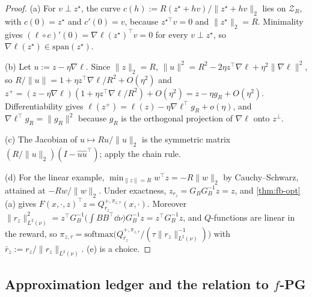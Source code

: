 \begin{proof}
(a) For $v\perp z^\star$, the curve $c(h):=R(z^\star+hv)/\|z^\star+hv\|_2$ lies on $\mathcal Z_R$, with $c(0)=z^\star$ and $c'(0)=v$, because $z^{\star\top}v=0$ and $\|z^\star\|_2=R$.
Minimality gives $(\ell\circ c)'(0)=\nabla\ell(z^\star)^\top v=0$ for every $v\perp z^\star$, so $\nabla\ell(z^\star)\in\mathrm{span}(z^\star)$.

(b) Let $u:=z-\eta\nabla\ell$. Since $\|z\|_2=R$, $\|u\|^2=R^2-2\eta z^\top\nabla\ell+\eta^2\|\nabla\ell\|^2$, so $R/\|u\|=1+\eta z^\top\nabla\ell/R^2+O(\eta^2)$ and
$z^+=(z-\eta\nabla\ell)(1+\eta z^\top\nabla\ell/R^2)+O(\eta^2)=z-\eta g_R+O(\eta^2)$.
Differentiability gives $\ell(z^+)=\ell(z)-\eta\nabla\ell^\top g_R+o(\eta)$, and $\nabla\ell^\top g_R=\|g_R\|^2$ because $g_R$ is the orthogonal projection of $\nabla\ell$ onto $z^\perp$.

(c) The Jacobian of $u\mapsto Ru/\|u\|_2$ is the symmetric matrix $(R/\|u\|_2)(I-\hat u\hat u^\top)$; apply the chain rule.

(d) For the linear example, $\min_{\|z\|=R}w^\top z=-R\|w\|_2$ by Cauchy--Schwarz, attained at $-Rw/\|w\|_2$.
Under exactness, $z_{r_z}=G_BG_B^{-1}z=z$, and \cref{thm:fb-opt}(a) gives $F(x,\cdot,z)^\top z=Q^{+,\pi_{z,\tau}}_{r_z}(x,\cdot)$.
Moreover $\|r_z\|^2_{L^2(\nu)}=z^\top G_B^{-1}\big(\int BB^\top\dd\nu\big)G_B^{-1}z=z^\top G_B^{-1}z$, and $Q$-functions are linear in the reward, so $\pi_{z,\tau}=\mathrm{softmax}\big(Q^{+,\pi_{z,\tau}}_{\bar r_z}/(\tau\|r_z\|^{-1}_{L^2(\nu)})\big)$ with $\bar r_z:=r_z/\|r_z\|_{L^2(\nu)}$. (e) is a choice.
\end{proof}

\subsection{Approximation ledger and the relation to \texorpdfstring{$f$}{f}-PG}\label{sec:fbil-ledger}

